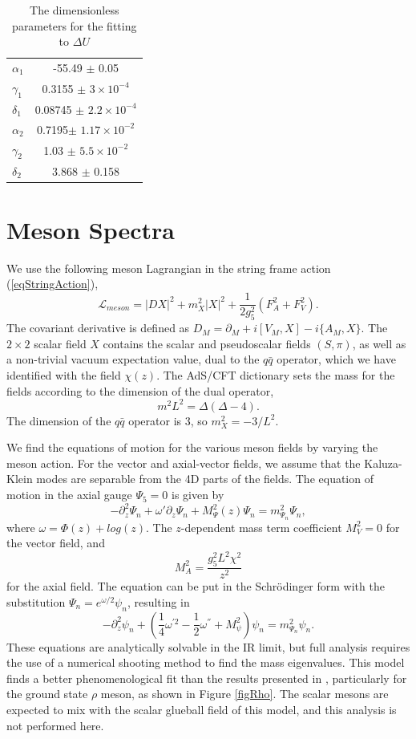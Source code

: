 \documentclass[12pt]{article}
\newcommand{\be}{\begin{equation}}
\newcommand{\ee}{\end{equation}}
\def\thalf{{\textstyle{\frac{1}{2}}}}
\def\oneqt{{\textstyle{\frac{1}{4}}}}
\newcommand{\cL}{\mathcal L}
\begin{document}
\begin{table}[htb]
\begin{center}
\label{tabFit}
\begin{tabular}{| l | c | }
\hline
$\alpha_1$ & -55.49 $\pm$ 0.05  \\
$\gamma_1$ & 0.3155 $\pm$ $ 3 \times 10^{-4}$ \\ 
$\delta_1$ & 0.08745 $\pm $ $2.2 \times 10^{-4}$\\ 
$\alpha_2$ & 0.7195$\pm $ $1.17 \times 10^{-2}$  \\
$\gamma_2$& 1.03 $\pm $ $5.5 \times 10^{-2}$ \\
$\delta_2$ & 3.868 $\pm $ 0.158 \\
  \hline
\end{tabular}
\caption{The dimensionless parameters for the fitting to $\Delta U$}
\end{center}
\end{table}

\section{Meson Spectra}

We use the following meson Lagrangian in the string frame action (\ref{eqStringAction}),
\be
\cL_{meson}=\left|DX\right|^2+m_X^2\left|X\right|^2 +\frac{1}{2g_5^2}\left(F_A^2 +F_V^2\right).
\label{eqMesonL}
\ee
The covariant derivative is defined as $D_M = \partial_M+i[V_M,X]-i\{A_M,X\}$. 
The $2 \times 2$ scalar  field $X$ contains the scalar and pseudoscalar fields $(S,\pi)$, as well as a non-trivial vacuum expectation value, dual to the $q\bar{q}$ operator, which we have identified with the field $\chi(z)$.
The AdS/CFT dictionary sets the mass for the fields according to the dimension of the dual operator,
\be
m^2L^2=\Delta(\Delta-4).
\ee
The dimension of the $q\bar{q}$ operator is 3, so $m_X^2 = -3/L^2$.

We find the equations of motion for the various meson fields by varying the meson action.
For the vector and axial-vector fields, we  assume that the Kaluza-Klein modes are separable from the 4D parts of the fields.
The equation of motion in the axial gauge $\Psi_5=0$  is given by
\be
-\partial_z^2\Psi_n+\omega'\partial_z\Psi_n +M_\Psi^2(z) \Psi_n=m^2_{\Psi_n}\Psi_n,
\ee
where $\omega=\Phi(z)+log(z)$. 
The $z$-dependent mass term coefficient $M^2_V=0$  for the vector field, and 
\be
M^2_A=\frac{g_5^2L^2\chi^2}{z^2}
\ee
for the axial field.
The equation can be put in the Schr{\"o}dinger form with the substitution $\Psi_n=e^{\omega/2}\psi_n$, resulting in
\be
-\partial^2_z\psi_n+\left(\oneqt \omega^{'2}-\thalf\omega^{''}+M_\psi^2\right)\psi_n=m^2_{\Psi_n}\psi_n.
\ee
These equations are analytically solvable in the IR limit, but full analysis requires the use of a numerical shooting method to find the mass eigenvalues.
This model finds a better phenomenological fit than the results presented in \cite{Gherghetta2009}, particularly for the ground state $\rho$ meson, as shown in Figure \ref{figRho}. 
The scalar mesons are expected to mix with the scalar glueball field of this model, and this analysis is not performed here. 
\end{document}
